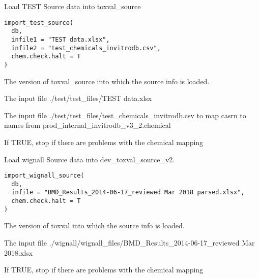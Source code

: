 \documentclass[letterpaper]{book}
\begin{document}
%
\begin{Description}\relax
Load TEST Source data into toxval\_source
\end{Description}
%
\begin{Usage}
\begin{verbatim}
import_test_source(
  db,
  infile1 = "TEST data.xlsx",
  infile2 = "test_chemicals_invitrodb.csv",
  chem.check.halt = T
)
\end{verbatim}
\end{Usage}
%
\begin{Arguments}
\begin{ldescription}
\item[\code{db}] The version of toxval\_source into which the source info is loaded.

\item[\code{infile1}] The input file ./test/test\_files/TEST data.xlsx

\item[\code{infile2}] The input file ./test/test\_files/test\_chemicals\_invitrodb.csv to map casrn to names from prod\_internal\_invitrodb\_v3\_2.chemical

\item[\code{chem.check.halt}] If TRUE, stop if there are problems with the chemical mapping
\end{ldescription}
\end{Arguments}
%
\begin{Description}\relax
Load wignall Source data into dev\_toxval\_source\_v2.
\end{Description}
%
\begin{Usage}
\begin{verbatim}
import_wignall_source(
  db,
  infile = "BMD_Results_2014-06-17_reviewed Mar 2018 parsed.xlsx",
  chem.check.halt = T
)
\end{verbatim}
\end{Usage}
%
\begin{Arguments}
\begin{ldescription}
\item[\code{db}] The version of toxval into which the source info is loaded.

\item[\code{infile}] The input file ./wignall/wignall\_files/BMD\_Results\_2014-06-17\_reviewed Mar 2018.xlsx

\item[\code{chem.check.halt}] If TRUE, stop if there are problems with the chemical mapping
\end{ldescription}
\end{Arguments}
\end{document}
